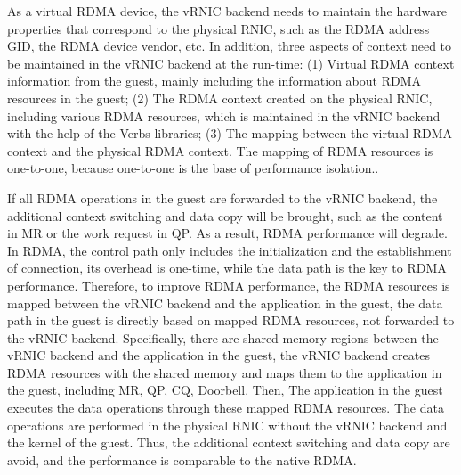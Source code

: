 As a virtual RDMA device, the vRNIC backend needs to maintain the hardware properties that correspond to the physical RNIC, such as the RDMA address GID, the RDMA device vendor, etc. In addition, three aspects of context need to be maintained in the vRNIC backend at the run-time:
(1) Virtual RDMA context information from the guest, mainly including the information about RDMA resources in the guest;
(2) The RDMA context created on the physical RNIC,  including various RDMA resources, which is maintained in the vRNIC backend with the help of the Verbs libraries;
(3) The mapping between the virtual RDMA context and the physical RDMA context. The mapping of RDMA resources is one-to-one,  because one-to-one is the base of performance isolation..

If all RDMA operations in the guest are forwarded to the vRNIC backend, the additional context switching and data copy will be brought, such as the content in MR or the work request in QP. As a result, RDMA performance will degrade. In RDMA, the control path only includes the initialization and the establishment of connection, its overhead is one-time, while the data path is the key to RDMA performance. Therefore, to improve RDMA performance, the RDMA resources is mapped between the vRNIC backend and the application in the guest, the data path in the guest is directly based on mapped RDMA resources, not forwarded to the vRNIC backend. Specifically, there are shared memory regions between the vRNIC backend and the application in the guest, the vRNIC backend creates RDMA resources with the shared memory and maps them to the application in the guest, including MR, QP, CQ, Doorbell. Then, The application in the guest executes the data operations through these mapped RDMA resources. The data operations are performed in the physical RNIC without the vRNIC backend and the kernel of the guest. Thus, the additional context switching and data copy are avoid, and the performance is comparable to the native RDMA.

